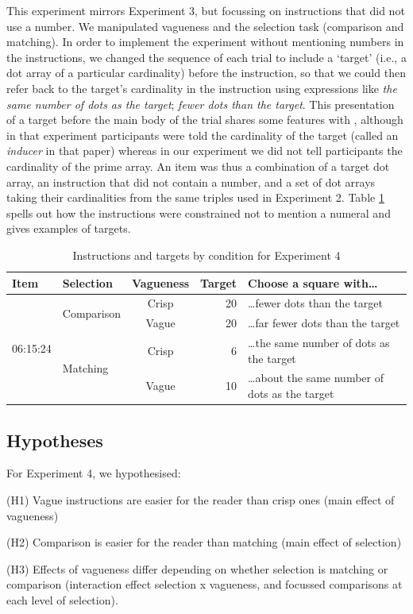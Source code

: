 \documentclass[%
man,		%
floatsintext,%
apacite%
]{apa6} %
\begin{document}
This experiment mirrors Experiment 3, but focussing on instructions that did not use a number. 
We manipulated vagueness and the selection task (comparison and matching). 
In order to implement the experiment without mentioning numbers in the instructions, we changed the sequence of each trial to include a `target' (i.e., a dot array of a particular cardinality) before the instruction, so that we could then refer back to the target's cardinality in the instruction using expressions like \emph{the same number of dots as the target}; \emph{fewer dots than the target}.
This presentation of a target before the main body of the trial shares some features with , although in that experiment participants were told the cardinality of the target (called an \emph{inducer} in that paper) whereas in our experiment we did not tell participants the cardinality of the prime array.
An item was thus a combination of a target dot array, an instruction that did not contain a number, and a set of dot arrays taking their cardinalities from the same triples used in Experiment 2.
Table \ref{Instructions for e4} spells out how the instructions were constrained not to mention a numeral and gives examples of targets.

\begin{table}[htp]
\caption{Instructions and targets by condition for Experiment 4}
\begin{center}
\begin{tabular}{llcrl}
Item					    &Selection						&Vagueness	&Target		&Choose a square with\ldots							\\
\toprule
\multirow{4}{*}{06:15:24} 	&\multirow{2}{*}{Comparison} 	&Crisp		&20			&\ldots fewer dots than the target					\\
\cline{3-5}
							&								&Vague		&20			&\ldots far fewer dots than the target				\\
\cline{2-5}
							&\multirow{2}{*}{Matching}		& Crisp		&6			&\ldots the same number of dots as the target		\\
\cline{3-5}
							& 		 						&Vague		&10 		&\ldots about the same number of dots as the target	\\
\bottomrule
\end{tabular}
\end{center}
\label{Instructions for e4}
\end{table}%
	
\subsection{Hypotheses}%
\noindent For Experiment 4, we hypothesised:
{\small
\begin{APAenumerate}
	\item [(H1)] Vague instructions are easier for the reader than crisp ones (main effect of vagueness)
	\item [(H2)] Comparison is easier for the reader than matching (main effect of selection)
	\item [(H3)] Effects of vagueness differ depending on whether selection is matching or comparison (interaction effect selection x vagueness, and focussed comparisons at each level of selection).
\end{APAenumerate}
}
\end{document}
